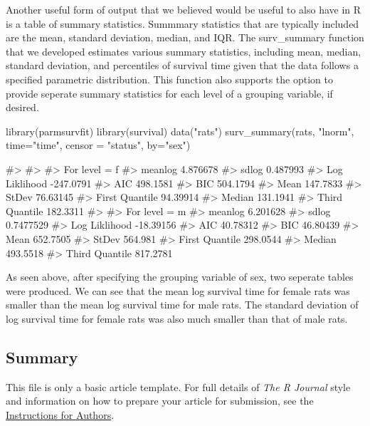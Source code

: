 Another useful form of output that we believed would be useful to also
have in R is a table of summary statistics. Summmary statistics that are
typically included are the mean, standard deviation, median, and IQR.
The surv\_summary function that we developed estimates various summary
statistics, including mean, median, standard deviation, and percentiles
of survival time given that the data follows a specified parametric
distribution. This function also supports the option to provide seperate
summary statistics for each level of a grouping variable, if desired.

\begin{Schunk}
\begin{Sinput}
library(parmsurvfit)
library(survival)
data("rats")
surv_summary(rats, "lnorm", time="time", censor = "status", by="sex")
\end{Sinput}
\begin{Soutput}
#> 
#> 
#> For level = f 
#> meanlog      4.876678
#> sdlog        0.487993
#> Log Liklihood    -247.0791
#> AIC      498.1581
#> BIC      504.1794
#> Mean     147.7833
#> StDev        76.63145
#> First Quantile   94.39914
#> Median       131.1941
#> Third Quantile   182.3311
#> 
#> For level = m 
#> meanlog      6.201628
#> sdlog        0.7477529
#> Log Liklihood    -18.39156
#> AIC      40.78312
#> BIC      46.80439
#> Mean     652.7505
#> StDev        564.981
#> First Quantile   298.0544
#> Median       493.5518
#> Third Quantile   817.2781
\end{Soutput}
\end{Schunk}

As seen above, after specifying the grouping variable of sex, two
seperate tables were produced. We can see that the mean log survival
time for female rats was smaller than the mean log survival time for
male rats. The standard deviation of log survival time for female rats
was also much smaller than that of male rats.

\hypertarget{summary}{%
\subsection{Summary}\label{summary}}

This file is only a basic article template. For full details of
\emph{The R Journal} style and information on how to prepare your
article for submission, see the
\href{https://journal.r-project.org/share/author-guide.pdf}{Instructions
for Authors}.




